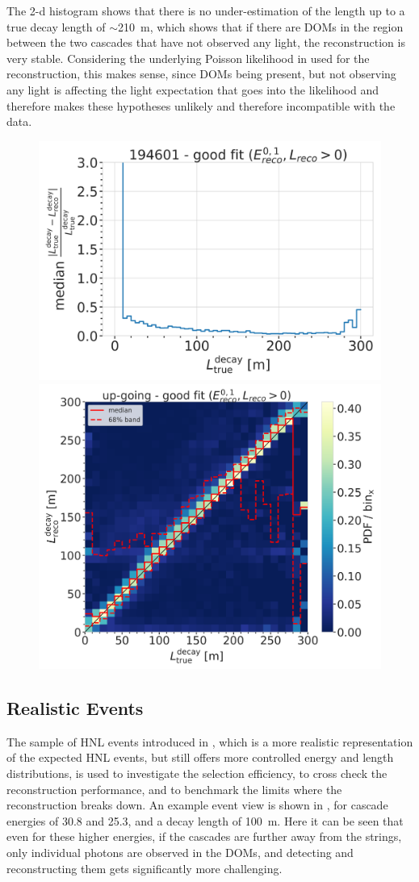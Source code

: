 The 2-d histogram shows that there is no under-estimation of the length up to a true decay length of $\sim$\SI{210}{\meter}, which shows that if there are DOMs in the region between the two cascades that have not observed any light, the reconstruction is very stable. Considering the underlying Poisson likelihood in  used for the reconstruction, this makes sense, since DOMs being present, but not observing any light is affecting the light expectation that goes into the likelihood and therefore makes these hypotheses unlikely and therefore incompatible with the data.

\begin{figure}[h]
	\centering
    \includegraphics[width=0.49\linewidth]{figures/model_independent_simulation/results/idealistic/194601_median_decay_length_resolution_goodfit_log_unweighted.png}
    \includegraphics[width=0.49\linewidth]{figures/model_independent_simulation/results/idealistic/194601_reco_decay_length_vs_true_decay_length_goodfit_step_contours.png}
    \caption[]{}
\end{figure}


\subsection{Realistic Events}

The sample of HNL events introduced in , which is a more realistic representation of the expected HNL events, but still offers more controlled energy and length distributions, is used to investigate the selection efficiency, to cross check the reconstruction performance, and to benchmark the limits where the reconstruction breaks down. An example event view is shown in , for cascade energies of \SI{30.8}{\gev} and \SI{25.3}{\gev}, and a decay length of \SI{100}{\meter}. Here it can be seen that even for these higher energies, if the cascades are further away from the strings, only individual photons are observed in the DOMs, and detecting and reconstructing them gets significantly more challenging.

